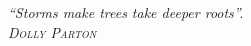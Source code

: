\begin{epigrafe}
   \textit{\large\textquotedblleft Storms make trees take deeper roots\textquotedblright.}
   \\
   \vspace{1cm}  
   \hspace{4cm} \emph{\textsc{Dolly Parton}}
    
\end{epigrafe}

